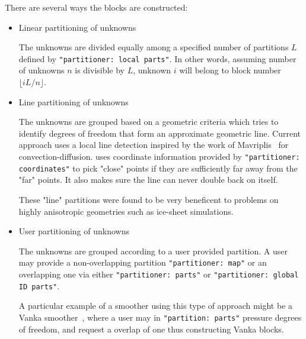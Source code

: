 There are several ways the blocks are constructed:
\begin{itemize}
  \item Linear partitioning of unknowns

    The unknowns are divided equally among a specified number of
    partitions $L$ defined by {\tt "partitioner: local parts"}. In other words,
    assuming number of unknowns $n$ is divisible by $L$, unknown $i$ will belong
    to block number $\lfloor iL/n \rfloor$.

  \item Line partitioning of unknowns

    The unknowns are grouped based on a geometric criteria which tries to
    identify degrees of freedom that form an approximate geometric line.
    Current approach uses a local line detection inspired by the work of
    Mavriplis~\cite{Mavriplis1999} for convection-diffusion. \ifpacktwo uses
    coordinate information provided by {\tt "partitioner: coordinates"} to pick
    "close" points if they are sufficiently far away from the "far" points. It
    also makes sure the line can never double back on itself.

    These "line" partitions were found to be very beneficent to problems on
    highly anisotropic geometries such as ice-sheet simulations.

  \item User partitioning of unknowns

    The unknowns are grouped according to a user provided partition. A user
    may provide a non-overlapping partition {\tt "partitioner: map"} or an
    overlapping one via either {\tt "partitioner: parts"} or {\tt "partitioner: global ID parts"}.

    A particular example of a smoother using  this type of approach might be a Vanka
    smoother~\cite{Vanka1986}, where a user may in {\tt "partition: parts"} pressure
    degrees of freedom, and request a overlap of one thus constructing Vanka
    blocks.


\end{itemize}
